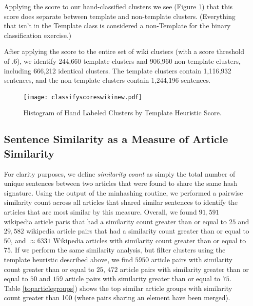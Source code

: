 \documentclass{acm_proc_article-sp}
\begin{document}
Applying the score to our hand-classified clusters we see (Figure \ref{heuristic}) that this score does separate between template and non-template clusters. (Everything that isn't in the Template class is considered a non-Template for the binary classification exercise.)

After applying the score to the entire set of wiki clusters (with a score threshold of .6), we identify 244,660 template clusters and 906,960 non-template clusters, including 666,212 identical clusters. The template clusters contain 1,116,932 sentences, and the non-template clusters contain 1,244,196 sentences.

\begin{figure}
\centering
\texttt{[image: classifyscoreswikinew.pdf]}
\caption{Histogram of Hand Labeled Clusters by Template Heuristic Score.}
\label{heuristic}
\end{figure}

\subsection{Sentence Similarity as a Measure of Article Similarity}

 For clarity purposes, we define \emph{similarity count} as simply the total number of unique sentences between two articles that were found to share the same hash signature. Using the output of the minhashing routine, we performed a pairwise similarity count across all articles that shared similar sentences to identify the articles that are most similar by this measure. Overall, we found $91,591$ wikipedia article paris that had a similarity count greater than or equal to $25$ and $29,582$ wikipedia article pairs that had a similarity count greater than or equal to $50$, and $\approx 6331$ Wikipedia articles with similarity count greater than or equal to $75$. If we perform the same similarity analysis, but filter clusters using the template heuristic described above, we find $5950$ article pairs with similarity count greater than or equal to $25$, $472$ article pairs with similarity greater than or equal to $50$ and $159$ article pairs with similarity greater than or equal to $75$. Table \ref{toparticlegroups}) shows the top similar article groups with similarity count greater than 100 (where pairs sharing an element have been merged).
\end{document}
